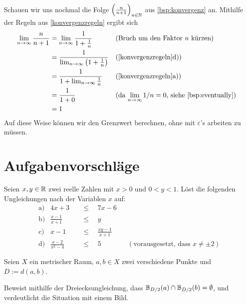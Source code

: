 \begin{bsp}
    Schauen wir uns nochmal die Folge $\left(\frac{n}{n+1}\right)_{n\in \mathbb N}$ aus \cref{bsp:konvergenz} an. Mithilfe der Regeln aus \cref{konvergenzregeln} ergibt sich
    \begin{align*}
        \lim_{n\to\infty} \frac{n}{n+1} & = \lim_{n\to\infty} \frac{1}{1+\frac{1}{n}} && (\text{Bruch um den Faktor $n$ kürzen}) \\
        & = \frac{1}{\lim_{n\to\infty} \left(1+\frac{1}{n}\right)} && (\text{\cref{konvergenzregeln}d)}) \\
        & = \frac{1}{1+\lim_{n\to\infty} \frac{1}{n}} && (\text{\cref{konvergenzregeln}a)}) \\
        & = \frac{1}{1+0} && (\text{da $\lim_{n\to\infty} 1/n=0$, siehe \cref{bsp:eventually}}) \\
        & = 1
    \end{align*}
    Auf diese Weise können wir den Grenzwert berechnen, ohne mit $\varepsilon$'s arbeiten zu müssen.
\end{bsp}





\clearpage
\section{Aufgabenvorschläge}


\begin{aufg}
    Seien $x,y\in \mathbb R$ zwei reelle Zahlen mit $x>0$ und $0<y<1$. Löst die folgenden Ungleichungen nach der Variablen $x$ auf:
    \begin{align*}
        &\text{a)} & 4x + 3 \quad&\le\quad 7x-6 \\[0.5em]
        &\text{b)} & \frac{x-1}{x+1} \quad&\le\quad y \\[0.5em]
        &\text{c)} & x-1 \quad&\le\quad \frac{xy-1}{x+1} \\[0.5em]
        &\text{d)} & \frac{x-2}{x^2-4} \quad&\le\quad 5 && (\text{vorausgesetzt, dass $x\neq \pm 2$})
    \end{align*}
\end{aufg}


\begin{aufg}
    Seien $X$ ein metrischer Raum, $a,b\in X$ zwei verschiedene Punkte und $D:=d(a,b)$.
    
    Beweist mithilfe der Dreiecksungleichung, dass $\mathbb B_{D/2}(a)\cap \mathbb B_{D/2}(b)=\emptyset$, und verdeutlicht die Situation mit einem Bild.
\end{aufg}


